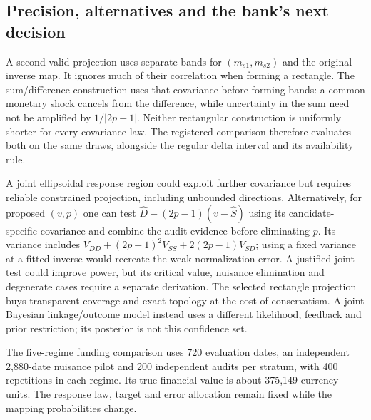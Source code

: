 \subsection{Precision, alternatives and the bank's next decision}
A second valid projection uses separate bands for $(m_{s1},m_{s2})$ and
the original inverse map. It ignores much of their correlation when forming
a rectangle. The sum/difference construction uses that covariance before
forming bands: a common monetary shock cancels from the difference, while
uncertainty in the sum need not be amplified by $1/|2p-1|$.
Neither rectangular construction is uniformly shorter for every covariance
law. The registered comparison therefore evaluates both on the same draws,
alongside the regular delta interval and its availability rule.

A joint ellipsoidal response region could exploit further covariance but
requires reliable constrained projection, including unbounded directions.
Alternatively, for proposed $(v,p)$ one can test
$\widehat D-(2p-1)(v-\widehat S)$ using its candidate-specific covariance
and combine the audit evidence before eliminating $p$. Its variance includes
$V_{DD}+(2p-1)^2V_{SS}+2(2p-1)V_{SD}$; using a fixed variance at a fitted
inverse would recreate the weak-normalization error. A justified joint
test could improve power, but its critical value, nuisance elimination and
degenerate cases require a separate derivation. The selected rectangle
projection buys transparent coverage and exact topology at the cost of
conservatism. A joint Bayesian linkage/outcome model
\citep{guha2022} instead uses a different likelihood, feedback and prior
restriction; its posterior is not this confidence set.



The five-regime funding comparison uses 720 evaluation dates, an independent
2,880-date nuisance pilot and 200 independent audits per stratum, with 400
repetitions in each regime. Its true financial value is about 375,149 currency
units. The response law, target and error allocation remain fixed while the
mapping probabilities change.

